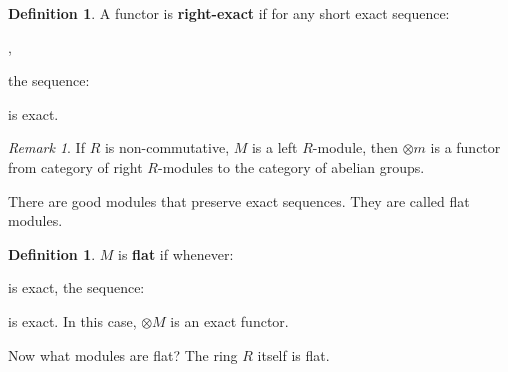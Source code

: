 \documentclass[12pt]{amsbook}
\theoremstyle{plain}
\numberwithin{section}{chapter}
\numberwithin{equation}{chapter}
\theoremstyle{definition}
\newtheorem{Def}[theorem]{Definition}
\theoremstyle{remark}
\newtheorem{rem}[theorem]{Remark}
\newcommand{\tens}{\otimes}
\renewcommand{\phi}{\varphi}
\begin{document}
\begin{Def}
A functor is \textbf{right-exact} if for any short exact sequence:
\begin{center}
,
\end{center}
the sequence:
\begin{center}
\end{center}
is exact. 
\end{Def}


\begin{rem}
If $R$ is non-commutative, $M$ is a left $R$-module, then $\tens m$ is a functor from category of right $R$-modules to the category of abelian groups. 
\end{rem}

There are good modules that preserve exact sequences. They are called flat modules. 

\begin{Def}
$M$ is \textbf{flat} if whenever:
\begin{center}
\end{center}
is exact, the sequence:
\begin{center}
\end{center}
is exact. In this case, $\tens M$ is an exact functor. 
\end{Def}

Now what modules are flat? The ring $R$ itself is flat. 
\end{document}

